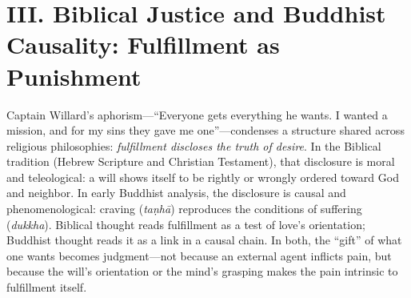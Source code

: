\section*{III. Biblical Justice and Buddhist Causality: Fulfillment as Punishment}
\label{sec:iii-biblical-justice-and-buddhist-causality}

Captain Willard's aphorism---``Everyone gets everything he wants. I wanted a mission, and for
my sins they gave me one''---condenses a structure shared across religious philosophies:
\emph{fulfillment discloses the truth of desire}. In the Biblical tradition (Hebrew Scripture
and Christian Testament), that disclosure is moral and teleological: a will shows itself to be
rightly or wrongly ordered toward God and neighbor. In early Buddhist analysis, the disclosure
is causal and phenomenological: craving (\emph{taṇhā}) reproduces the conditions of suffering
(\emph{dukkha}). Biblical thought reads fulfillment as a test of love's orientation; Buddhist
thought reads it as a link in a causal chain. In both, the ``gift'' of what one wants becomes
judgment---not because an external agent inflicts pain, but because the will's orientation or
the mind's grasping makes the pain intrinsic to fulfillment itself.


\pagebreak[2]

\pagebreak[2]

\pagebreak[2]

\pagebreak[2]


